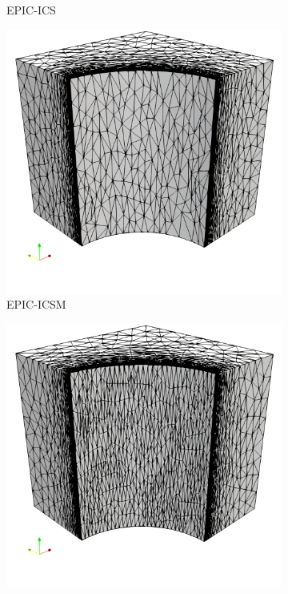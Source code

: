 \documentclass[3p,times,procedia,number]{elsarticle}
\begin{document}
\begin{figure}
\begin{subfigure}{.24\textwidth}
\caption{EPIC-ICS}
\end{subfigure}
\begin{subfigure}{.24\textwidth}
\centering
\includegraphics[width=\textwidth]{epic-icsm-cube-cylinder-polar-1.png}
\caption{EPIC-ICSM}
\end{subfigure}
\begin{subfigure}{.24\textwidth}
\centering
\includegraphics[width=\textwidth]{omega_h-cube-cylinder-polar-1.png}

\end{subfigure}
\end{figure}
\end{document}
